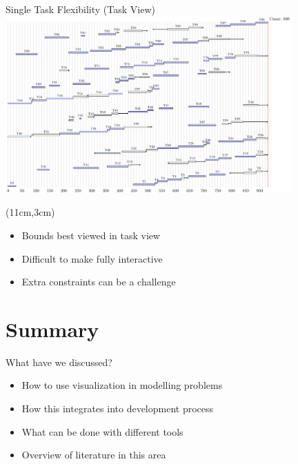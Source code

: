 \begin{frame}{Single Task Flexibility (Task View)}
\includegraphics[width=11cm]{images/mt10taskfreedom}
\begin{textblock*}{4.5cm}(11cm,3cm)
\begin{itemize}
\item Bounds best viewed in task view
    \item Difficult to make fully interactive 
    \item Extra constraints can be a challenge
\end{itemize}
\end{textblock*}
\end{frame}


\section{Summary}

\begin{frame}{What have we discussed?}
\begin{itemize}
    \item How to use visualization in modelling problems
    \item How this integrates into development process
    \item What can be done with different tools
    \item Overview of literature in this area
\end{itemize}    
\end{frame}

